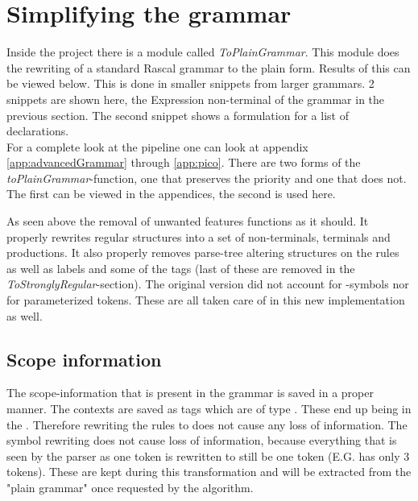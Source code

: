 \section{Simplifying the grammar}
Inside the project there is a module called \emph{ToPlainGrammar}. This module does the rewriting of a standard Rascal grammar to the plain form. Results of this can be viewed below. This is done in smaller snippets from larger grammars. 2 snippets are shown here, the Expression non-terminal of the grammar in the previous section. The second snippet shows a formulation for a list of declarations.\\
For a complete look at the pipeline one can look at appendix \ref{app:advancedGrammar} through \ref{app:pico}. There are two forms of the \textit{toPlainGrammar}-function, one that preserves the priority and one that does not. The first can be viewed in the appendices, the second is used here.

\pagebreak

As seen above the removal of unwanted features functions as it should. It properly rewrites regular structures into a set of non-terminals, terminals and productions. It also properly removes parse-tree altering structures on the rules as well as labels and some of the tags (last of these are removed in the \textit{ToStronglyRegular}-section). The original version did not account for -symbols nor for parameterized tokens. These are all taken care of in this new implementation as well.

\subsection{Scope information}
The scope-information that is present in the grammar is saved in a proper manner. The contexts are saved as tags which are of type . These end up being in the . Therefore rewriting the rules to  does not cause any loss of information. The symbol rewriting does not cause loss of information, because everything that is seen by the parser as one token is rewritten to still be one token (E.G.  has only 3 tokens). These are kept during this transformation and will be extracted from the "plain grammar" once requested by the algorithm.

